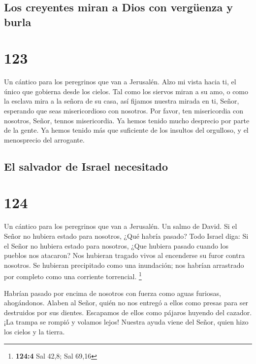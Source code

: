 \hypertarget{los-creyentes-miran-a-dios-con-verguxfcenza-y-burla}{%
\subsection{Los creyentes miran a Dios con vergüenza y
burla}\label{los-creyentes-miran-a-dios-con-verguxfcenza-y-burla}}

\hypertarget{section-122}{%
\section{123}\label{section-122}}

Un cántico para los peregrinos que van a Jerusalén.  Alzo
mi vista hacia ti, el único que gobierna desde los cielos.
 Tal como los siervos miran a su amo, o como la esclava
mira a la señora de su casa, así fijamos nuestra mirada en ti, Señor,
esperando que seas misericordioso con nosotros.  Por
favor, ten misericordia con nosotros, Señor, tennos misericordia. Ya
hemos tenido mucho desprecio por parte de la gente.  Ya
hemos tenido más que suficiente de los insultos del orgulloso, y el
menosprecio del arrogante.

\hypertarget{el-salvador-de-israel-necesitado}{%
\subsection{El salvador de Israel
necesitado}\label{el-salvador-de-israel-necesitado}}

\hypertarget{section-123}{%
\section{124}\label{section-123}}

Un cántico para los peregrinos que van a Jerusalén. Un salmo de David.
 Si el Señor no hubiera estado para nosotros, ¿Qué habría
pasado? Todo Israel diga:  Si el Señor no hubiera estado
para nosotros, ¿Que hubiera pasado cuando los pueblos nos atacaron?
 Nos hubieran tragado vivos al encenderse su furor contra
nosotros.  Se hubieran precipitado como una inundación;
nos habrían arrastrado por completo como una corriente torrencial.
\footnote{\textbf{124:4} Sal 42,8; Sal 69,16}

 Habrían pasado por encima de nosotros con fuerza como
aguas furiosas, ahogándonos.  Alaben al Señor, quién no
nos entregó a ellos como presas para ser destruidos por sus dientes.
 Escapamos de ellos como pájaros huyendo del cazador. ¡La
trampa se rompió y volamos lejos!  Nuestra ayuda viene del
Señor, quien hizo los cielos y la tierra.

